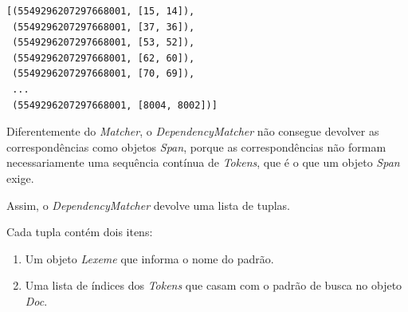 \documentclass[
  brazilian,
]{article}
\providecommand{\tightlist}{%
  \setlength{\itemsep}{0pt}\setlength{\parskip}{0pt}}
\begin{document}
\begin{verbatim}
[(5549296207297668001, [15, 14]),
 (5549296207297668001, [37, 36]),
 (5549296207297668001, [53, 52]),
 (5549296207297668001, [62, 60]),
 (5549296207297668001, [70, 69]),
 ...
 (5549296207297668001, [8004, 8002])]
\end{verbatim}

Diferentemente do \emph{Matcher}, o \emph{DependencyMatcher} não
consegue devolver as correspondências como objetos \emph{Span}, porque
as correspondências não formam necessariamente uma sequência contínua de
\emph{Tokens}, que é o que um objeto \emph{Span} exige.

Assim, o \emph{DependencyMatcher} devolve uma lista de tuplas.

Cada tupla contém dois itens:

\begin{enumerate}
\def\labelenumi{\arabic{enumi}.}
\tightlist
\item
  Um objeto \emph{Lexeme} que informa o nome do padrão.
\item
  Uma lista de índices dos \emph{Tokens} que casam com o padrão de busca
  no objeto \emph{Doc}.
\end{enumerate}
\end{document}
